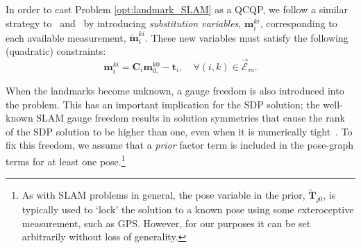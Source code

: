 \documentclass[lettersize,journal]{IEEEtran}
\newcommand{\EdgeSet}{\vec{\bm{\mathcal{E}}}}
\begin{document}
In order to cast Problem \eqref{opt:landmark_SLAM} as a QCQP, we follow a similar strategy to~\cite{dumbgenSafeSmoothCertified2023} and~\cite{brialesCertifiablyGloballyOptimal2018} by introducing \textit{substitution variables}, $ \bm{m}_i^{ki} $, corresponding to each available measurement, $ \tilde{\bm{m}}_i^{ki} $. These new variables must satisfy the following (quadratic) constraints:
\begin{equation}
	\bm{m}_i^{ki} = \bm{C}_i\bm{m}_{0,}^{k0} - \bm{t}_i, \quad \forall (i,k)\in\EdgeSet_m.
\end{equation}

When the landmarks become unknown, a gauge freedom is also introduced into the problem. This has an important implication for the SDP solution; the well-known SLAM gauge freedom results in solution symmetries that cause the rank of the SDP solution to be higher than one, even when it is numerically tight~\cite{brialesCertifiablyGloballyOptimal2018}. To fix this freedom, we assume that a \emph{prior} factor term is included in the pose-graph terms for at least one pose.\footnote{As with SLAM problems in general, the pose variable in the prior, $\tilde{\bm{T}}_{j0}$, is typically used to `lock' the solution to a known pose using some exteroceptive measurement, such as GPS. However, for our purposes it can be set arbitrarily without loss of generality.}
\end{document}
